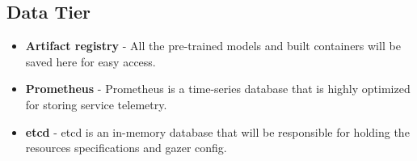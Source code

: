 \subsection{Data Tier}

\begin{itemize}
    \item \textbf{Artifact registry} - All the pre-trained models and built containers will be saved here for easy access.
    \item \textbf{Prometheus} - Prometheus is a time-series database that is highly optimized for storing service telemetry.
    \item \textbf{etcd} - etcd is an in-memory database that will be responsible for holding the resources specifications and \ac{gazer} config.
\end{itemize}